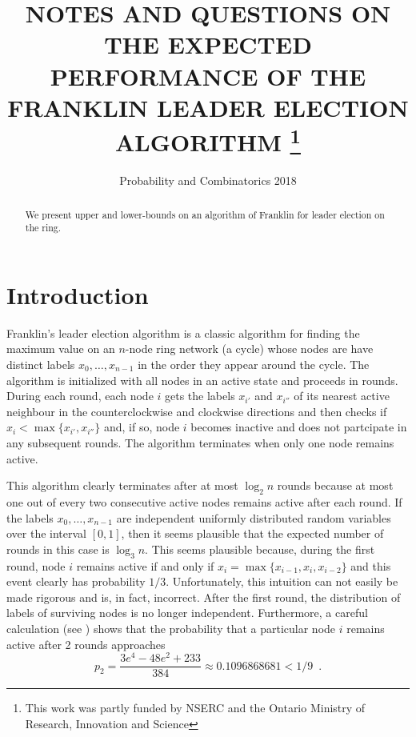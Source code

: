 \documentclass{patmorin}
\title{\MakeUppercase{Notes and Questions on the Expected Performance 
   of the Franklin Leader Election Algorithm}%
   \thanks{This work was partly funded by NSERC and the Ontario Ministry of
    Research, Innovation and Science}}
\author{Probability and Combinatorics 2018}
\begin{document}
\maketitle
%
\begin{abstract}
  We present upper and lower-bounds on an algorithm of Franklin for
  leader election on the ring.
\end{abstract}
%
%


\section{Introduction}

Franklin's leader election algorithm is a classic algorithm for finding
the maximum value on an $n$-node ring network (a cycle) whose nodes are
have distinct labels $x_0,\ldots,x_{n-1}$ in the order they appear around
the cycle.  The algorithm is initialized with all nodes in an active
state and proceeds in rounds.  During each round, each node $i$ gets the
labels $x_{i'}$ and $x_{i''}$ of its nearest active neighbour in
the counterclockwise and clockwise directions and then checks if $x_i <
\max\{x_{i'},x_{i''}\}$ and, if so, node $i$ becomes inactive and does
not partcipate in any subsequent rounds.  The algorithm terminates when
only one node remains active.

This algorithm clearly terminates after at most $\log_2 n$ rounds because
at most one out of every two consecutive active nodes remains active
after each round.  If the labels $x_0,\ldots,x_{n-1}$ are independent
uniformly distributed random variables over the interval $[0,1]$, then
it seems plausible that the expected number of rounds in this case is
$\log_3 n$.  This seems plausible because, during the first round, node
$i$ remains active if and only if $x_i=\max\{x_{i-1},x_i,x_{i-2}\}$ and
this event clearly has probability $1/3$.  Unfortunately, this intuition
can not easily be made rigorous and is, in fact, incorrect. After the
first round, the distribution of labels of surviving nodes is no longer
independent. Furthermore, a careful calculation (see ) shows
that the probability that a particular node $i$ remains active after 2
rounds approaches
\[
    p_2 = \frac{3e^4 - 48e^2 + 233}{384} \approx 0.1096868681 < 1/9 \enspace .
\]




\end{document}
